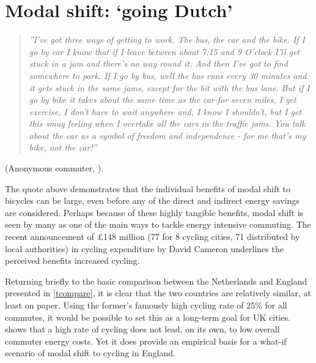 \documentclass[a4paper, 11pt, twoside]{Thesis}
\begin{document}
\section{Modal shift: `going Dutch'} 
\label{smshift} 
\begin{quote}
\textit{''I've got three ways of getting to work. The bus, the car and the bike.
If I go
by car I know that if I leave between about 7:15 and 9 O’clock I'll get stuck in
a jam and there's no way round it. And then I've got to find somewhere to park.
If I go by bus, well the bus runs every 30 minutes and it gets stuck in the same
jams, except for the bit with the bus lane. But if I go by bike it takes about
the same time as the car for seven miles, I get exercise, I don’t have to wait
anywhere and, I know I shouldn't, but
I get this smug feeling when I overtake all the cars in the traffic jams. You
talk about the car as a symbol of freedom and independence - for me that’s my
bike, not the car!''}\end{quote}
\begin{flushright}
  (Anonymous commuter, \citealp[p.~61]{Goodwin1991a}).
\end{flushright} 

The quote above demonstrates that the individual benefits of modal shift
to bicycles can be large, even before any of the direct and indirect energy
savings are considered. Perhaps because of these highly tangible benefits,
modal shift is seen by many as one of the main
ways to tackle energy intensive commuting. The recent announcement of
\pounds148 million (77 for 8 cycling cities, 71 distributed by local
authorities) in cycling expenditure by David Cameron underlines the perceived
benefits increased cycling.

Returning briefly to the basic comparison between the Netherlands and England
presented in \cref{tcompare}, it is clear that the two countries are relatively
similar, at least on paper. Using the former's famously high cycling rate of
25\% for all commutes, it would be possible to set this as a long-term goal for
UK cities.  shows that a high rate of cycling does not
lead, on its own, to low overall commuter energy costs. Yet it does provide an
empirical basis for a what-if scenario of modal shift to cycling in England.
\end{document}
